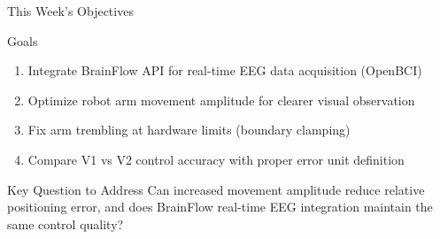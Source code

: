 \documentclass[aspectratio=169, 11pt]{beamer}
\begin{document}
\begin{frame}{This Week's Objectives}
    \begin{block}{Goals}
        \begin{enumerate}
            \item Integrate BrainFlow API for real-time EEG data acquisition (OpenBCI)
            \item Optimize robot arm movement amplitude for clearer visual observation
            \item Fix arm trembling at hardware limits (boundary clamping)
            \item Compare V1 vs V2 control accuracy with proper error unit definition
        \end{enumerate}
    \end{block}
    
    \vspace{5mm}
    
    \begin{alertblock}{Key Question to Address}
        Can increased movement amplitude reduce relative positioning error, and does BrainFlow real-time EEG integration maintain the same control quality?
    \end{alertblock}
\end{frame}
\end{document}
